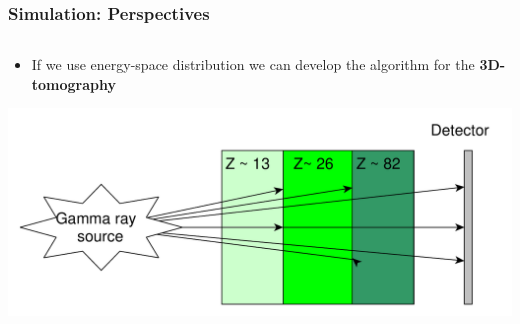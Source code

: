 \documentclass[11pt]{beamer}
\begin{document}
    \begin{frame}
    \frametitle{Simulation: Perspectives}
    \begin{columns}
                \begin{column}{1\textwidth}
                    \begin{itemize}
                        \item If we use energy-space distribution we can develop the algorithm for the \textbf{3D-tomography} 
                      
                    \end{itemize}

                \includegraphics[width=1\textwidth]{figures/yed_schema_2.pdf}
                
            \end{column}
    \end{columns}  
\end{frame}
\end{document}
